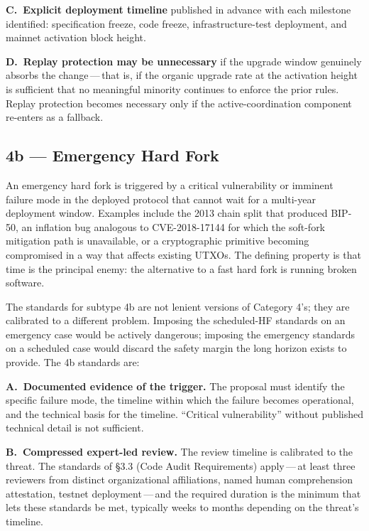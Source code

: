 \documentclass[11pt, twoside, openright]{book}
\newcommand{\reqitem}[2]{\medskip\noindent\textbf{#1\ #2}\quad\ignorespaces}
\newcommand{\sect}[1]{\S#1}
\begin{document}
\reqitem{C.}{Explicit deployment timeline} published in advance with each milestone identified: specification freeze, code freeze, infrastructure-test deployment, and mainnet activation block height.

\reqitem{D.}{Replay protection may be unnecessary} if the upgrade window genuinely absorbs the change\,---\,that is, if the organic upgrade rate at the activation height is sufficient that no meaningful minority continues to enforce the prior rules. Replay protection becomes necessary only if the active-coordination component re-enters as a fallback.

\subsection*{4b --- Emergency Hard Fork}

An emergency hard fork is triggered by a critical vulnerability or imminent failure mode in the deployed protocol that cannot wait for a multi-year deployment window. Examples include the 2013 chain split that produced BIP-50, an inflation bug analogous to CVE-2018-17144 for which the soft-fork mitigation path is unavailable, or a cryptographic primitive becoming compromised in a way that affects existing UTXOs. The defining property is that time is the principal enemy: the alternative to a fast hard fork is running broken software.

The standards for subtype 4b are not lenient versions of Category 4's; they are calibrated to a different problem. Imposing the scheduled-HF standards on an emergency case would be actively dangerous; imposing the emergency standards on a scheduled case would discard the safety margin the long horizon exists to provide. The 4b standards are:

\reqitem{A.}{Documented evidence of the trigger.} The proposal must identify the specific failure mode, the timeline within which the failure becomes operational, and the technical basis for the timeline. ``Critical vulnerability'' without published technical detail is not sufficient.

\reqitem{B.}{Compressed expert-led review.} The review timeline is calibrated to the threat. The standards of \sect{3.3} (Code Audit Requirements) apply\,---\,at least three reviewers from distinct organizational affiliations, named human comprehension attestation, testnet deployment\,---\,and the required duration is the minimum that lets these standards be met, typically weeks to months depending on the threat's timeline.
\end{document}
